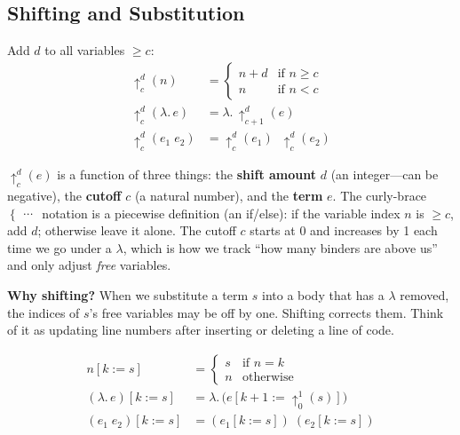 \documentclass[11pt,a4paper]{article}
\theoremstyle{definition}
\newcommand{\lam}{\lambda}
\begin{document}
\subsection{Shifting and Substitution}

\begin{defnbox}
Add $d$ to all variables $\geq c$:
\vspace{-0.5em}
\begin{align*}
  \uparrow^d_c(n) &=
    \begin{cases} n + d & \text{if } n \geq c \\ n & \text{if } n < c \end{cases} \\
  \uparrow^d_c(\lam.\, e) &= \lam.\, \uparrow^d_{c+1}(e) \\
  \uparrow^d_c(e_1\; e_2) &= \uparrow^d_c(e_1)\;\; \uparrow^d_c(e_2)
\end{align*}
\end{defnbox}

\begin{intuition}
$\uparrow^d_c(e)$ is a function of three things: the \textbf{shift amount} $d$
(an integer---can be negative), the \textbf{cutoff} $c$ (a natural number), and
the \textbf{term} $e$. The curly-brace $\begin{cases}\cdots\end{cases}$
notation is a piecewise definition (an if/else):
if the variable index $n$ is $\geq c$, add $d$; otherwise leave it alone.
The cutoff $c$ starts at 0 and increases by 1 each time we go under a $\lam$,
which is how we track ``how many binders are above us'' and only adjust
\emph{free} variables.

\medskip
\textbf{Why shifting?} When we substitute a term $s$ into a body that has a
$\lam$ removed, the indices of $s$'s free variables may be off by one. Shifting
corrects them. Think of it as updating line numbers after inserting or deleting
a line of code.
\end{intuition}

\begin{defnbox}
\vspace{-0.5em}
\begin{align*}
  n[k := s]                &= \begin{cases} s & \text{if } n = k \\ n & \text{otherwise} \end{cases} \\
  (\lam.\, e)[k := s]      &= \lam.\, \bigl(e[k{+}1 := \uparrow^1_0(s)]\bigr) \\
  (e_1\; e_2)[k := s]      &= (e_1[k := s])\;(e_2[k := s])
\end{align*}
\end{defnbox}
\end{document}
